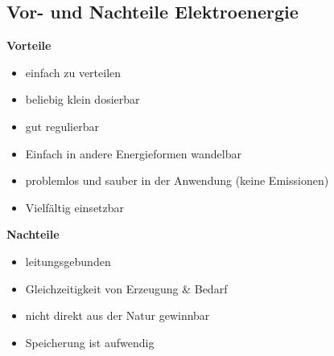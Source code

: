 \subsection{Vor- und Nachteile Elektroenergie}
    \begin{minipage}[t]{0.49\columnwidth}
        \textbf{Vorteile}
        \begin{itemize}
            \item einfach zu verteilen
            \item beliebig klein dosierbar
            \item gut regulierbar
            \item Einfach in andere Energieformen wandelbar
            \item problemlos und sauber in der Anwendung (keine Emissionen)
            \item Vielfältig einsetzbar
        \end{itemize}
    \end{minipage}%
    \hfill
    \begin{minipage}[t]{0.49\columnwidth}
        \textbf{Nachteile}
        \begin{itemize}
            \item leitungsgebunden
            \item Gleichzeitigkeit von Erzeugung \& Bedarf
            \item nicht direkt aus der Natur gewinnbar
            \item Speicherung ist aufwendig
        \end{itemize}
    \end{minipage}



